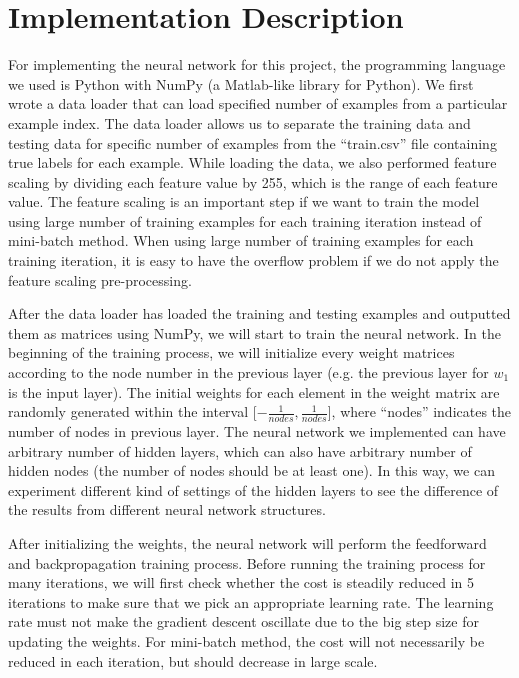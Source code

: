 \documentclass[11pt,letterpaper]{article}
\begin{document}
\section{Implementation Description}
For implementing the neural network for this project, the programming language we used is Python with NumPy (a Matlab-like library for Python). We first wrote a data loader that can load specified number of examples from a particular example index. The data loader allows us to separate the training data and testing data for specific number of examples from the “train.csv” file containing true labels for each example. While loading the data, we also performed feature scaling by dividing each feature value by 255, which is the range of each feature value. The feature scaling is an important step if we want to train the model using large number of training examples for each training iteration instead of mini-batch method. When using large number of training examples for each training iteration, it is easy to have the overflow problem if we do not apply the feature scaling pre-processing. 

After the data loader has loaded the training and testing examples and outputted them as matrices using NumPy,  we will start to train the neural network. In the beginning of the training process, we will initialize every weight matrices according to the node number in the previous layer (e.g. the previous layer for $w_1$ is the input layer). The initial weights for each element in the weight matrix are randomly generated within the interval [$-\frac{1}{nodes}, \frac{1}{nodes}$], where “nodes” indicates the number of nodes in previous layer. The neural network we implemented can have arbitrary number of hidden layers, which can also have arbitrary number of hidden nodes (the number of nodes should be at least one). In this way, we can experiment different kind of settings of the hidden layers to see the difference of the results from different neural network structures.

After initializing the weights, the neural network will perform the feedforward and backpropagation training process. Before running the training process for many iterations, we will first check whether the cost is steadily reduced in 5 iterations to make sure that we pick an appropriate learning rate. The learning rate must not make the gradient descent oscillate due to the big step size for updating the weights. For mini-batch method, the cost will not necessarily be reduced in each iteration, but should decrease in large scale. 
\end{document}
